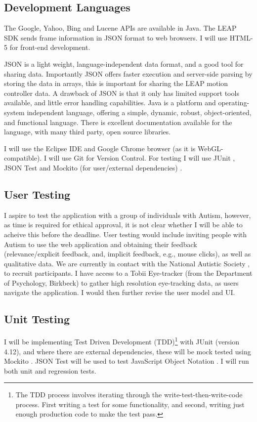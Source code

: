 \documentclass[a4paper, 11pt]{article}
\begin{document}
\begin{justify}
\subsection{Development Languages}
The Google, Yahoo, Bing and Lucene APIs are available in Java. The LEAP SDK sends frame information in JSON format to web browsers. I will use HTML-5 for front-end development.

JSON is a light weight, language-independent data format, and a good tool for sharing data. Importantly JSON offers faster execution and server-side parsing by storing the data in arrays, this is important for sharing the LEAP motion controller data. A drawback of JSON is that it only has limited support tools available, and little error handling capabilities. Java is a platform and operating-system independent language, offering a simple, dynamic, robust, object-oriented, and functional language. There is excellent documentation available for the language, with many third party, open source libraries.

I will use the Eclipse IDE and Google Chrome browser (as it is WebGL-compatible). I will use Git for Version Control. For testing I will use JUnit \cite{junit}, JSON Test \cite{jsontest} and Mockito (for user/external dependencies) \cite{mockito}.

\subsection{User Testing}
I aspire to test the application with a group of individuals with Autism, however, as time is required for ethical approval, it is not clear whether I will be able to acheive this before the deadline. User testing would include inviting people with Autism to use the web application and obtaining their feedback (relevance/explicit feedback, and, implicit feedback, e.g., mouse clicks), as well as qualitative data. We are currently in contact with the National Autistic Society \cite{nas}, to recruit participants. I have access to a Tobii Eye-tracker (from the Department of Psychology, Birkbeck) to gather high resolution eye-tracking data, as users navigate the application. I would then further revise the user model and UI.

\subsection{Unit Testing}
I will be implementing Test Driven Development (TDD)\footnote{The TDD process involves iterating through the write-test-then-write-code process. First writing a test for some functionality, and second, writing just enough production code to make the test pass.} with JUnit (version 4.12), and where there are external dependencies, these will be mock tested using Mockito \cite{mockito}. JSON Test will be used to test JavaScript Object Notation \cite{jsontest}. I will run both unit and regression tests.


\end{justify}
\end{document}
